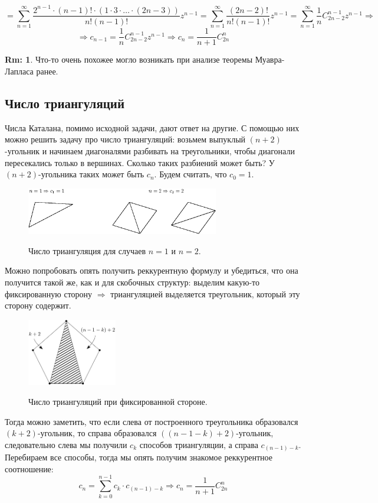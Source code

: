 \documentclass[12pt]{article}
\theoremstyle{definition}
\newtheorem{rem}{Rm:}
\newcommand{\ddsum}[2]{\displaystyle\sum\limits_{#1}^{#2}}
\begin{document}
$$
	= \ddsum{n = 1}{\infty}\dfrac{2^{n-1}{\cdot}(n-1)!{\cdot}(1{\cdot}3{\cdot}\dotsc{\cdot}(2n -3))}{n!(n-1)!}z^{n-1} = \ddsum{n = 1}{\infty}\dfrac{(2n-2)!}{n!(n-1)!}z^{n-1} = \ddsum{n = 1}{\infty}\dfrac{1}{n}C_{2n -2}^{n-1}z^{n-1} \Rightarrow
$$
$$
	\Rightarrow c_{n-1} = \dfrac{1}{n}C_{2n -2}^{n-1}z^{n-1} \Rightarrow c_n = \dfrac{1}{n+1}C_{2n}^n
$$
\begin{rem}
	Что-то очень похожее могло возникать при анализе теоремы Муавра-Лапласа ранее.
\end{rem}

\subsection*{Число триангуляций}

Числа Каталана, помимо исходной задачи, дают ответ на другие. С помощью них можно решить задачу про число триангуляций: возьмем выпуклый $(n+2)$-угольник и начинаем диагоналями разбивать на треугольники, чтобы диагонали пересекались только в вершинах. Сколько таких разбиений может быть? У $(n+2)$-угольника таких может быть $c_n$. Будем считать, что $c_0 = 1$. 
\begin{figure}[H]
	\centering
	\includegraphics[width=0.75\textwidth]{MA3L18_1.eps}
	\label{MA3L18_1}
	\caption{Число триангуляция для случаев $n = 1$ и $n = 2$.}
	\label{fig:число триангуляций}
\end{figure}
Можно попробовать опять получить реккурентную формулу и убедиться, что она получится такой же, как и для скобочных структур: выделим какую-то фиксированную сторону $\Rightarrow$ триангуляцией выделяется треугольник, который эту сторону содержит. 
\begin{figure}[H]
	\centering
	\includegraphics[width=0.35\textwidth]{MA3L18_2.png}
	\label{MA3L18_2}
	\caption{Число триангуляций при фиксированной стороне.}
	\label{fig: триангуляции}
\end{figure}
Тогда можно заметить, что если слева от построенного треугольника образовался $(k+2)$-угольник, то справа образовался $((n - 1 - k) + 2)$-угольник, следовательно слева мы получили $c_k$ способов триангуляции, а справа $c_{(n - 1) - k}$. Перебираем все способы, тогда мы опять получим знакомое реккурентное соотношение:
$$
	c_n = \ddsum{k = 0}{n - 1}c_k{\cdot}c_{(n - 1) - k } \Rightarrow c_n = \dfrac{1}{n+1}C_{2n}^n
$$
\end{document}
